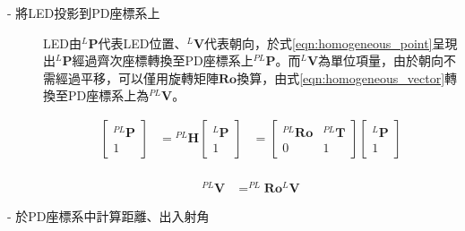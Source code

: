     \begin{description}

        

        \item[- 將LED投影到PD座標系上]\hfill 
        
        \qquad
        LED由$^L \boldsymbol{P}$代表LED位置、$^L \boldsymbol{V}$代表朝向，於式\ref{eqn:homogeneous_point}呈現出$^L \boldsymbol{P}$經過齊次座標轉換至PD座標系上$^{PL} \boldsymbol{P}$。而$^L \boldsymbol{V}$為單位項量，由於朝向不需經過平移，可以僅用旋轉矩陣$\boldsymbol{Ro}$換算，由式\ref{eqn:homogeneous_vector}轉換至PD座標系上為$^{PL}\boldsymbol{V}$。

        \begin{equation}
            \label{eqn:homogeneous_point}
            \begin{aligned}
            \left[\begin{array}{cc}
            { }^{P L} \boldsymbol{P} \\
            1
            \end{array}\right]&={ }^{P L} \boldsymbol{H}\left[\begin{array}{c}
            { }^{L} \boldsymbol{P} \\
            1
            \end{array}\right] &=\left[\begin{array}{cc}
            { }^{P L} \boldsymbol{R} \boldsymbol{o} & { }^{P L} \boldsymbol{T} \\
            0 & 1
            \end{array}\right]\left[\begin{array}{c}
            { }^{L} \boldsymbol{P} \\
            1
            \end{array}\right] \\
        \end{aligned}
        \end{equation}
        
        \begin{equation}
            \label{eqn:homogeneous_vector}
            \begin{aligned}
            ^{P L} \boldsymbol{V} &=^{P L} \boldsymbol{R} \boldsymbol{o} ^{L}\boldsymbol{ V} 
            \end{aligned}
        \end{equation}




        \item[- 於PD座標系中計算距離、出入射角]\hfill 
        

\end{description}
